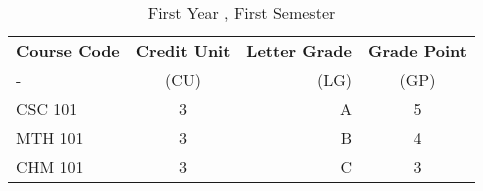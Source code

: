 \documentclass{article}
\begin{document}
\begin{table}[h!]
	\begin{center}
		\caption{First Year , First Semester}
		\label{tab:table1}
		\begin{tabular}{l|c|r|c}
			\textbf{Course Code} & \textbf{Credit Unit} &
			\textbf{Letter Grade} & \textbf{Grade Point}\\
			- & (CU) & (LG) & (GP) \\
			\hline
			CSC 101 & 3 & A & 5\\
			MTH 101 & 3 & B & 4\\
			CHM 101 & 3 & C & 3\\
						\end{tabular}
		\end{center}
	\end{table}
\end{document}
